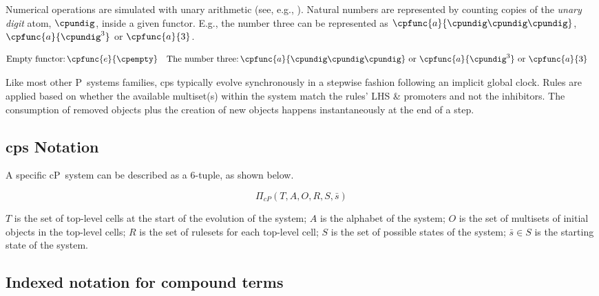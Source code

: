 Numerical operations are simulated with unary arithmetic (see, e.g., \cite{Aman2019,Bonchis2006}).  Natural numbers are represented by counting copies of the \emph{unary digit} atom, \(\cpundig\), inside a given functor.  E.g., the number three can be represented as \(\cpfunc{a}{\cpundig\cpundig\cpundig}\), \(\cpfunc{a}{\cpundig^3}\) or \(\cpfunc{a}{3}\).

\begin{framed}
\vspace{-1.1cm}
    \begin{align*}
        \text{Empty functor:}&\, \cpfunc{e}{\cpempty} & \text{The number three:}&\, \cpfunc{a}{\cpundig\cpundig\cpundig} \text{ or } \cpfunc{a}{\cpundig^3} \text{ or } \cpfunc{a}{3}
    \end{align*}
\vspace{-0.8cm}
\end{framed}

Like most other P~systems families, \gls{cps} typically evolve synchronously in a stepwise fashion following an implicit global clock.  Rules are applied based on whether the available multiset(s) within the system match the rules' LHS \& promoters and not the inhibitors.  The consumption of removed objects plus the creation of new objects happens instantaneously at the end of a step.

\subsection{\label{sec:nmp:notation}\texorpdfstring{\gls{cps}}{cP systems} Notation}
A specific cP~system can be described as a 6-tuple, as shown below.

\begin{framed}
\vspace{-1.0cm}
\[
\Pi_{cP}(T, A, O, R, S, \bar{s})
\]
\vspace{-0.7cm}
\end{framed}

\(T\) is the set of top-level cells at the start of the evolution of the system; \(A\) is the alphabet of the system; \(O\) is the set of multisets of initial objects in the top-level cells; \(R\) is the set of rulesets for each top-level cell; \(S\) is the set of possible states of the system; \(\bar{s} \in S\) is the starting state of the system.

\subsection{\label{sec:nmp:compoundterms}Indexed notation for compound terms}

